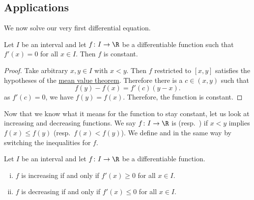 \documentclass[12pt]{book}
\begin{document}
\subsection*{Applications}

We now solve our very first differential equation.

\begin{prop} \label{prop:derzeroconst}
Let $I$ be an interval and
let $f \colon I \to \R$ be a differentiable function such that $f'(x) = 0$
for all $x \in I$.
Then $f$ is constant.
\end{prop}

\begin{proof}
Take arbitrary $x,y \in I$ with $x < y$.
Then $f$ restricted to $[x,y]$ satisfies the hypotheses
of the \hyperref[thm:mvt]{mean value theorem}.
Therefore there is a $c \in (x,y)$ such that
\begin{equation*}
f(y)-f(x) = f'(c)(y-x).
\end{equation*}
as $f'(c) = 0$, we have $f(y) = f(x)$.
Therefore,
the function is constant.
\end{proof}

Now that we know what it means for the function to stay constant, let us look
at increasing and decreasing functions.
We say $f \colon I \to \R$ is \emph{}
(resp.\  \emph{}) if
$x < y$ implies $f(x) \leq f(y)$ (resp.\ $f(x) < f(y)$).
We define
\emph{} and
\emph{} in the same way by switching the
inequalities for $f$.

\begin{prop} \label{incdecdiffprop}
Let $I$ be an interval and
let $f \colon I \to \R$ be a differentiable function.
\begin{enumerate}[(i)]
\item $f$ is increasing if and only if $f'(x) \geq 0$ for all $x \in I$.
\item $f$ is decreasing if and only if $f'(x) \leq 0$ for all $x \in I$.
\end{enumerate}
\end{prop}
\end{document}
